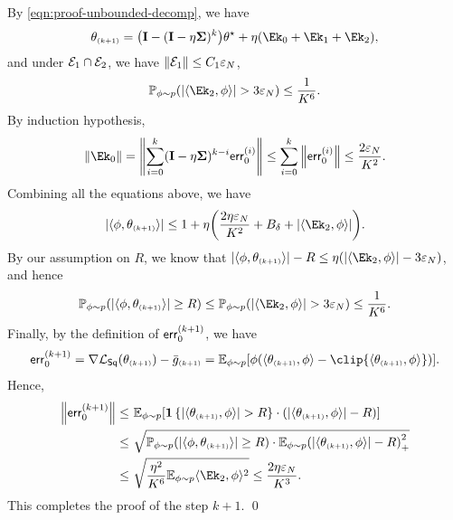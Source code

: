 By \eqref{eqn:proof-unbounded-decomp}, we have
\begin{align*}
    \pa{k+1}=\paren{\id-(\id-\eta\bSigma)^k}\ths+\eta\paren{\Ek_0+\Ek_1+\Ek_2},
\end{align*}
and under $\mathcal{E}_1\cap \mathcal{E}_2$, we have $\left\|\mathcal{E}_1\right\|\leq C_1\varepsilon_N$, 
\begin{align*}
    \Pp{ \absn{\lr \Ek_2, \x\rr}> 3\epsN }\leq \frac{1}{K^6}.
\end{align*}
By induction hypothesis, 
\begin{align*}
    \nrm{\Ek_0}=\nrm{\sum_{i=0}^{k} (\id-\eta\bSigma)^{k-i}\err{i}_0}
    \leq \sum_{i=0}^{k} \nrm{\err{i}_0}\leq \frac{2\epsN}{K^2}.
\end{align*}
Combining all the equations above, we have
\begin{align*}
    \abs{\lr\x, \pa{k+1}\rr}
    \leq 1+\eta\paren{\frac{2\eta\epsN}{K^2}+B_\delta+\abs{\lr \Ek_2, \x\rr}}.
\end{align*}
By our assumption on $R$, we know that $\abs{\lr\x, \pa{k+1}\rr}-R\leq \eta\paren{\absn{\lr \Ek_2, \x\rr}-3\epsN}$, and hence
\begin{align*}
    \Pp{ \absn{\lr\x, \pa{k+1}\rr} \geq R}
    \leq \Pp{ \absn{\lr \Ek_2, \x\rr}> 3\epsN } \leq \frac{1}{K^6}.
\end{align*}
Finally, by the definition of $\mathsf{err}^{(k+1)}_0$, we have
\begin{align*}
    \err{k+1}_0=\nabla \Lsq(\pa{k+1})-\ogd{k+1}
    =\Ep{ \x\paren{ \lr \pa{k+1},\x \rr-\clip{\lr \pa{k+1},\x \rr} }}.
\end{align*}
Hence,
\begin{align*}
    \nrm{\err{k+1}_0}\leq&~ \Ep{\indic{ \absn{\lr \pa{k+1},\x \rr}>R }\cdot \paren{ \absn{\lr \pa{k+1},\x \rr} - R } } \\
    \leq&~ \sqrt{\Pp{ \absn{\lr\x, \pa{k+1}\rr} \geq R} \cdot \Epp{\paren{\absn{\lr \pa{k+1},\x \rr}-R}_+^2  }} \\
    \leq&~ \sqrt{\frac{\eta^2}{K^6}\Epp{\lr \Ek_2,\x \rr^2 } }
    \leq \frac{2\eta\epsN }{K^3}.
\end{align*}
This completes the proof of the step $k+1$.
\qed

